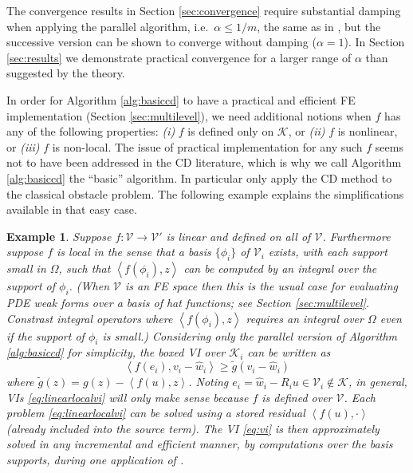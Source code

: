 \documentclass[letterpaper,final,12pt,reqno]{amsart}
\theoremstyle{cstyle}
\theoremstyle{cstyle*}
\theoremstyle{dstyle}
\newtheorem{example}[theorem]{Example}
\numberwithin{equation}{section}
\numberwithin{figure}{section}
\numberwithin{table}{section}
\numberwithin{theorem}{section}
\newcommand{\cK}{\mathcal{K}}
\newcommand{\cV}{\mathcal{V}}
\newcommand{\ip}[2]{\left<#1,#2\right>}
\begin{document}
The convergence results in Section \ref{sec:convergence} require substantial damping when applying the parallel algorithm, i.e.~$\alpha \le 1/m$, the same as in \cite{Tai2003}, but the successive version can be shown to converge without damping ($\alpha=1$).  In Section \ref{sec:results} we demonstrate practical convergence for a larger range of $\alpha$ than suggested by the theory.  %

In order for Algorithm \ref{alg:basiccd} to have a practical and efficient FE implementation (Section \ref{sec:multilevel}), we need additional notions when $f$ has any of the following properties: \emph{(i)} $f$ is defined only on $\cK$, or \emph{(ii)} $f$ is nonlinear, or \emph{(iii)} $f$ is non-local.  The issue of practical implementation for any such $f$ seems not to have been addressed in the CD literature, which is why we call Algorithm \ref{alg:basiccd} the ``basic'' algorithm.  In particular  \cite{GraeserKornhuber2009,Tai2003} only apply the CD method to the classical obstacle problem.  The following example explains the simplifications available in that easy case.

\begin{example}  \label{ex:fnice} Suppose $f:\cV \to \cV'$ is linear and defined on all of $\cV$.  Furthermore suppose $f$ is local in the sense that a basis $\{\phi_i\}$ of $\cV_i$ exists, with each support small in $\Omega$, such that $\ip{f(\phi_i)}{z}$ can be computed by an integral over the support of $\phi_i$.  (When $\cV$ is an FE space then this is the usual case for evaluating PDE weak forms over a basis of hat functions; see Section \ref{sec:multilevel}.  Constrast integral operators where $\ip{f(\phi_i)}{z}$ requires an integral over $\Omega$ even if the support of $\phi_i$ is small.)  Considering only the parallel version of Algorithm \ref{alg:basiccd} for simplicity, the boxed VI over $\cK_i$ can be written as
\begin{equation}
\ip{f(e_i)}{v_i-\hat w_i} \ge \tilde g(v_i-\hat w_i) \label{eq:linearlocalvi}
\end{equation}
where $\tilde g(z) = g(z) - \ip{f(u)}{z}$.  Noting $e_i = \hat w_i - R_i u \in \cV_i \notin \cK$, in general, VIs \eqref{eq:linearlocalvi} will only make sense because $f$ is defined over $\cV$.  Each problem \eqref{eq:linearlocalvi} can be solved using a stored residual $\ip{f(u)}{\cdot}$ (already included into the source term).  The VI \eqref{eq:vi} is then approximately solved in any incremental and efficient manner, by computations over the basis supports, during one application of .
\end{example}
\end{document}
